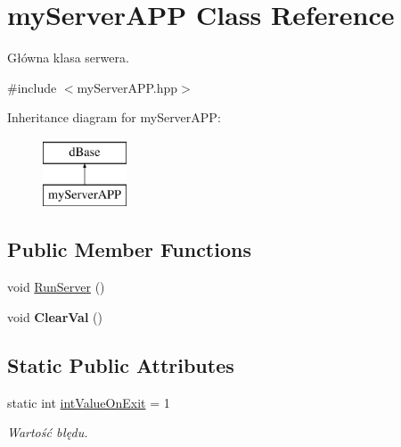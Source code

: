 \hypertarget{classmyServerAPP}{
\section{myServerAPP Class Reference}
\label{classmyServerAPP}
}


Główna klasa serwera.  




{\ttfamily \#include $<$myServerAPP.hpp$>$}

Inheritance diagram for myServerAPP:\begin{figure}[H]
\begin{center}
\leavevmode
\includegraphics[height=2cm]{classmyServerAPP}
\end{center}
\end{figure}
\subsection*{Public Member Functions}
\begin{DoxyCompactItemize}
\item 
void \hyperlink{classmyServerAPP_a1683e57c122e19f851e350fc3095caed}{RunServer} ()
\item 
\hypertarget{classmyServerAPP_ac7e5b2a8b38dee34c64b5c6e9ca5fba1}{
void {\bfseries ClearVal} ()}
\label{classmyServerAPP_ac7e5b2a8b38dee34c64b5c6e9ca5fba1}

\end{DoxyCompactItemize}
\subsection*{Static Public Attributes}
\begin{DoxyCompactItemize}
\item 
\hypertarget{classmyServerAPP_ae183443a38d0b8e96762083c42385db3}{
static int \hyperlink{classmyServerAPP_ae183443a38d0b8e96762083c42385db3}{intValueOnExit} = 1}
\label{classmyServerAPP_ae183443a38d0b8e96762083c42385db3}

\begin{DoxyCompactList}\small\item\em Wartość błędu. \item\end{DoxyCompactList}\end{DoxyCompactItemize}


